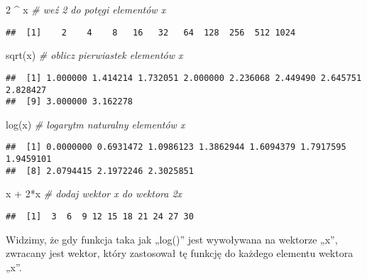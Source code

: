 \documentclass[
]{article}
\newenvironment{Shaded}{\begin{snugshade}}{\end{snugshade}}
\newcommand{\CommentTok}[1]{\textcolor[rgb]{0.56,0.35,0.01}{\textit{#1}}}
\newcommand{\DecValTok}[1]{\textcolor[rgb]{0.00,0.00,0.81}{#1}}
\newcommand{\FunctionTok}[1]{\textcolor[rgb]{0.00,0.00,0.00}{#1}}
\newcommand{\NormalTok}[1]{#1}
\newcommand{\SpecialCharTok}[1]{\textcolor[rgb]{0.00,0.00,0.00}{#1}}
\begin{document}
\begin{Shaded}
\begin{Highlighting}[]
\DecValTok{2} \SpecialCharTok{\^{}}\NormalTok{ x     }\CommentTok{\# weź 2 do potęgi elementów x}
\end{Highlighting}
\end{Shaded}

\begin{verbatim}
##  [1]    2    4    8   16   32   64  128  256  512 1024
\end{verbatim}

\begin{Shaded}
\begin{Highlighting}[]
\FunctionTok{sqrt}\NormalTok{(x)   }\CommentTok{\# oblicz pierwiastek elementów x}
\end{Highlighting}
\end{Shaded}

\begin{verbatim}
##  [1] 1.000000 1.414214 1.732051 2.000000 2.236068 2.449490 2.645751 2.828427
##  [9] 3.000000 3.162278
\end{verbatim}

\begin{Shaded}
\begin{Highlighting}[]
\FunctionTok{log}\NormalTok{(x)    }\CommentTok{\# logarytm naturalny elementów x}
\end{Highlighting}
\end{Shaded}

\begin{verbatim}
##  [1] 0.0000000 0.6931472 1.0986123 1.3862944 1.6094379 1.7917595 1.9459101
##  [8] 2.0794415 2.1972246 2.3025851
\end{verbatim}

\begin{Shaded}
\begin{Highlighting}[]
\NormalTok{x }\SpecialCharTok{+} \DecValTok{2}\SpecialCharTok{*}\NormalTok{x   }\CommentTok{\# dodaj wektor x do wektora 2x}
\end{Highlighting}
\end{Shaded}

\begin{verbatim}
##  [1]  3  6  9 12 15 18 21 24 27 30
\end{verbatim}

Widzimy, że gdy funkcja taka jak „log()'' jest wywoływana na wektorze
„x'', zwracany jest wektor, który zastosował tę funkcję do każdego
elementu wektora „x''.
\end{document}
